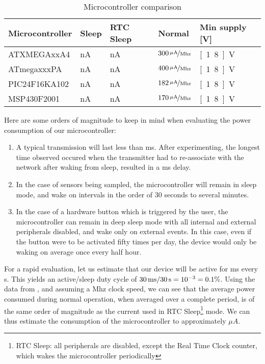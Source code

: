 \begin{table}
  \centering
  \begin{tabular}{l|l|l|l|l}
    Microcontroller	& Sleep	& RTC Sleep & Normal & Min supply [V]	\\
    \hline
    ATXMEGAxxA4		& \unit[100]{nA} & \unit[600]{nA} &
    			$\unitfrac[300]{\mu{}A}{Mhz}$ & \unit[1.8]{V}	\\
    ATmegaxxxPA		& \unit[100]{nA} & \unit[650]{nA} &
    			$\unitfrac[400]{\mu{}A}{Mhz}$ & \unit[1.8]{V}	\\
    PIC24F16KA102	& \unit[20]{nA} & \unit[510]{nA} &
    			$\unitfrac[182]{\mu{}A}{Mhz}$ & \unit[1.8]{V}	\\
    MSP430F2001		& \unit[50]{nA} & \unit[600]{nA} &
    			$\unitfrac[170]{\mu{}A}{Mhz}$ & \unit[1.8]{V}	\\
  \end{tabular}
  \caption{Microcontroller comparison}
  \label{tab:microcontrollers}
\end{table}

Here are some orders of magnitude to keep in mind when evaluating the power
consumption of our microcontroller:
\begin{enumerate}
  \item A typical transmission will last less than \unit[20]{ms}. After
    experimenting, the longest time observed occured when the transmitter had to
    re-associate with the network after waking from sleep, resulted in a
    \unit[60]{ms} delay.
  \item In the case of sensors being sampled, the microcontroller will remain in
    sleep mode, and wake on intervals in the order of 30 seconds to several
    minutes. 
  \item In the case of a hardware button which is triggered by the user, the
    microcontroller can remain in deep sleep mode with all internal and external
    peripherals disabled, and wake only on external events. In this case, even
    if the button were to be activated fifty times per day, the device would
    only be waking on average once every half hour.
\end{enumerate}

For a rapid evaluation, let us estimate that our device will be active for
\unit[30]{ms} every \unit[30]{s}. This yields an active/sleep duty cycle of
$\unit[30]{ms}/\unit[30]{s}=10^{-3}=0.1\%$. Using the data from
, and assuming a \unit[2]{Mhz} clock speed, we can see
that the average power consumed during normal operation, when averaged over a
complete period, is of the same order of magnitude as the current used in RTC
Sleep\footnote{RTC Sleep: all peripherals are disabled, except the Real Time
Clock counter, which wakes the microcontroller periodically} mode. We can thus
estimate the consumption of the microcontroller to approximately
\unit[1-10]{$\mu{}A$}.

